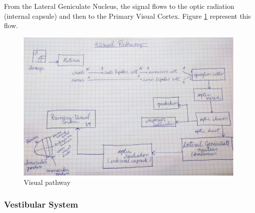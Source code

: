 \documentclass[12pt,article,oneside,a4paper]{memoir}
\begin{document}
\begin{enumerate}
From the Lateral Geniculate Nucleus, the signal flows to the optic radiation (internal capsule) and then to the Primary Visual Cortex. Figure \ref{fig:visual-pathway} represent this flow.

\begin{figure}[H]
	\centering
  	\includegraphics[width=0.8\linewidth]{imgs/visual-pathway.jpg}
	\caption{Visual pathway}
  	\label{fig:visual-pathway}
\end{figure}


\end{enumerate}

\subsubsection{Vestibular System}
\end{document}
